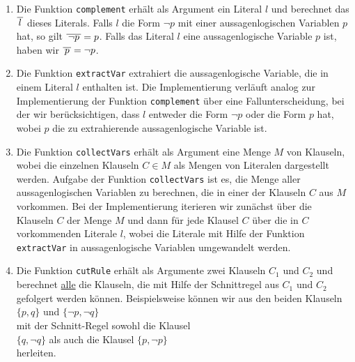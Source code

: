 \begin{enumerate}
\item Die Funktion \texttt{complement} erhält als Argument ein Literal $l$ und berechnet das
       $\overline{\,l\,}$ dieses Literals.  Falls $l$ die Form $\neg p$ mit einer
      aussagenlogischen Variablen $p$ hat, so gilt $\overline{\,\neg p\,} = p$.   Falls das Literal
      $l$ eine aussagenlogische Variable $p$ ist, haben wir $\overline{\,p\,} = \neg p$.
\item Die Funktion \texttt{extractVar} extrahiert die aussagenlogische Variable, die in einem Literal $l$
      enthalten ist.  Die Implementierung verläuft analog zur Implementierung der Funktion
      \texttt{complement} über eine Fallunterscheidung, bei der wir berücksichtigen, dass $l$ entweder die Form
      $\neg p$ oder die Form $p$ hat, wobei $p$ die zu extrahierende aussagenlogische Variable ist.
\item Die Funktion \texttt{collectVars} erhält als Argument eine Menge $M$ von Klauseln, wobei die
      einzelnen Klauseln  \mbox{$C \!\in\! M$} als Mengen von Literalen dargestellt werden.  Aufgabe der
      Funktion \texttt{collectVars} ist es, die Menge aller aussagenlogischen Variablen zu
      berechnen, die in einer der Klauseln $C$ aus $M$ vorkommen.  Bei der Implementierung iterieren
      wir zunächst über die Klauseln $C$ der Menge $M$ und dann für jede Klausel $C$ über die in $C$
      vorkommenden Literale $l$, wobei die Literale mit Hilfe der Funktion \texttt{extractVar} in
      aussagenlogische Variablen umgewandelt werden.
\item Die Funktion \texttt{cutRule} erhält als Argumente zwei Klauseln $C_1$ und $C_2$ und berechnet
      \underline{\color{red}alle} die Klauseln, die mit Hilfe der Schnittregel aus $C_1$ und $C_2$ gefolgert werden
      können.  Beispielsweise können wir aus den beiden Klauseln
      \\[0.2cm]
      \hspace*{1.3cm}
      $\{ p, q \}$ \quad und \quad $\{ \neg p, \neg q \}$ 
      \\[0.2cm]
      mit der Schnitt-Regel sowohl die Klausel
      \\[0.2cm]
      \hspace*{1.3cm}
      $\{q, \neg q\}$ \quad als auch die Klausel \quad $\{p, \neg p \}$
      \\[0.2cm]
      herleiten.
\end{enumerate}

